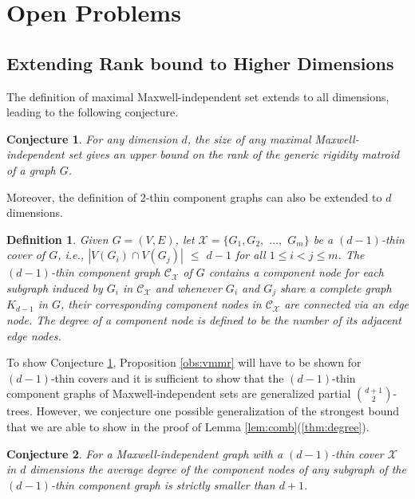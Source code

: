 \documentclass[10pt]{article}
\def\X{\mathcal {X}}
\def\C{\mathscr{C}}
\newtheorem{dfn}{Definition}
\newtheorem{conjecture}{Conjecture}
\begin{document}
\section{Open Problems}
\label{conclusion}

\subsection{Extending Rank bound to Higher Dimensions}\label{sec:higher}

The definition of maximal Maxwell-independent set extends to all dimensions, leading to the following conjecture.
\begin{conjecture}\label{conj:kdim}
For any dimension $d$, the size of any maximal Maxwell-independent set gives an upper bound on the rank of the generic rigidity matroid of a graph $G$.
\end{conjecture}


\medskip\noindent
Moreover, the definition of 2-thin component graphs can also be extended to $d$ dimensions.

\begin{dfn}\label{dfn:dDimcomponentGraph}
Given $G=(V, E)$, let $\X=\{G_1, G_2,$ $ \ldots,$ $ G_m\}$ be a $(d-1)$-thin cover of $G$, i.e., $|V(G_i) \cap V(G_j) |$ $\leq$ $d-1$ for all $1 \leq i < j \leq m$. The {\em $(d-1)$-thin component graph} $\C_{\X}$ of $G$ contains a {\em component node} for each subgraph induced by $G_i$ in $\C_{\X}$ and whenever $G_i$ and $G_j$ share
a complete graph $K_{d-1}$ in $G$, their corresponding component nodes in $\C_{\X}$ are connected via an {\em edge
node}. The {\em degree} of a component node is defined to be the number of its adjacent edge nodes.
\end{dfn}

\medskip\noindent
To show Conjecture \ref{conj:kdim}, Proposition \ref{obs:vmmr} will have to be shown for $(d-1)$-thin covers and it is sufficient to show that the  $(d-1)$-thin component graphs of Maxwell-independent
sets are generalized partial ${d+1 \choose 2}$-trees. However, we conjecture one possible generalization of the
strongest bound that we are able to show in the proof of Lemma \ref{lem:comb}(\ref{thm:degree}).

\begin{conjecture}\label{conj:kdimTree}
For a Maxwell-independent graph with a $(d-1)$-thin cover $\X$ in $d$ dimensions
the average degree of the component nodes of any subgraph of the $(d-1)$-thin component graph is strictly
smaller than $d+1$.
\end{conjecture}
\end{document}
